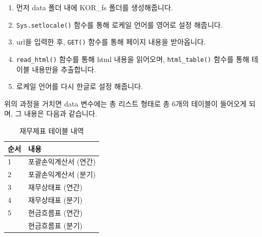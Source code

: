 \documentclass[]{book}
\newenvironment{Shaded}{\begin{snugshade}}{\end{snugshade}}
\newcommand{\ControlFlowTok}[1]{\textcolor[rgb]{0.13,0.29,0.53}{\textbf{#1}}}
\newcommand{\DecValTok}[1]{\textcolor[rgb]{0.00,0.00,0.81}{#1}}
\newcommand{\KeywordTok}[1]{\textcolor[rgb]{0.13,0.29,0.53}{\textbf{#1}}}
\newcommand{\NormalTok}[1]{#1}
\newcommand{\OperatorTok}[1]{\textcolor[rgb]{0.81,0.36,0.00}{\textbf{#1}}}
\newcommand{\OtherTok}[1]{\textcolor[rgb]{0.56,0.35,0.01}{#1}}
\newcommand{\StringTok}[1]{\textcolor[rgb]{0.31,0.60,0.02}{#1}}
\providecommand{\tightlist}{%
  \setlength{\itemsep}{0pt}\setlength{\parskip}{0pt}}
\begin{document}
\begin{Shaded}
\end{Shaded}

\begin{enumerate}
\def\labelenumi{\arabic{enumi}.}
\tightlist
\item
  먼저 data 폴더 내에 KOR\_fs 폴더를 생성해줍니다.
\item
  \texttt{Sys.setlocale()} 함수를 통해 로케일 언어를 영어로 설정 해줍니다.
\item
  url을 입력한 후, \texttt{GET()} 함수를 통해 페이지 내용을 받아옵니다.
\item
  \texttt{read\_html()} 함수를 통해 html 내용을 읽어오며, \texttt{html\_table()} 함수를 통해 테이블 내용만을 추출합니다.
\item
  로케일 언어를 다시 한글로 설정 해줍니다.
\end{enumerate}

위의 과정을 거치면 data 변수에는 총 리스트 형태로 총 6개의 테이블이 들어오게 되며, 그 내용은 다음과 같습니다.

\begin{table}[t]

\caption{\label{tab:unnamed-chunk-12}재무제표 테이블 내역}
\centering
\begin{tabular}{ll}
\toprule
순서 & 내용\\
\midrule
1 & 포괄손익계산서 (연간)\\
2 & 포괄손익계산서 (분기)\\
3 & 재무상태표 (연간)\\
4 & 재무상태표 (분기)\\
5 & 현금흐름표 (연간)\\
\addlinespace
6 & 현금흐름표 (분기)\\
\bottomrule
\end{tabular}
\end{table}
\end{document}

